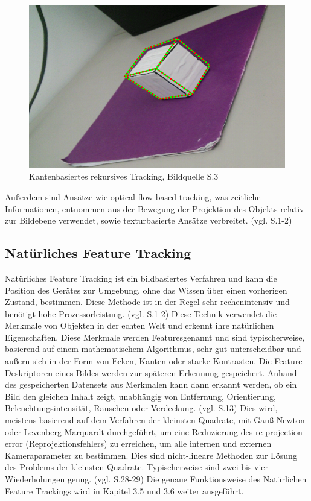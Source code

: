 \begin{figure}[H]
	\centering
	\includegraphics[scale=0.7]{wire.png}
	\caption{Kantenbasiertes rekursives Tracking, Bildquelle \cite{model_based} S.3}
\end{figure} 

Außerdem sind Ansätze wie \glqq optical flow based tracking\grqq{}, was zeitliche Informationen, entnommen aus der Bewegung der Projektion des Objekts relativ zur Bildebene verwendet, sowie texturbasierte Ansätze verbreitet. (vgl. \cite{model_based} S.1-2)

\subsection{Natürliches Feature Tracking}

Natürliches Feature Tracking ist ein bildbasiertes Verfahren und kann die Position des Gerätes zur Umgebung, ohne das Wissen über einen vorherigen Zustand, bestimmen. Diese Methode ist in der Regel sehr rechenintensiv und benötigt hohe Prozessorleistung. (vgl. \cite{model_based} S.1-2) Diese Technik verwendet die Merkmale von Objekten in der echten Welt und erkennt ihre natürlichen Eigenschaften. Diese Merkmale werden \glqq Features\grqq genannt und sind typischerweise, basierend auf einem mathematischem Algorithmus, sehr gut unterscheidbar und außern sich in der Form von Ecken, Kanten oder starke Kontrasten. Die Feature Deskriptoren eines Bildes werden zur späteren Erkennung gespeichert. Anhand des gespeicherten Datensets aus Merkmalen kann dann erkannt werden, ob ein Bild den gleichen Inhalt zeigt, unabhängig von Entfernung, Orientierung, Beleuchtungsintensität, Rauschen oder Verdeckung. (vgl. \cite{comparative_sdks} S.13) Dies wird, meistens basierend auf dem Verfahren der kleinsten Quadrate, mit Gauß-Newton oder Levenberg-Marquardt durchgeführt, um eine Reduzierung des \glqq re-projection error\grqq{} (Reprojektionsfehlers) zu erreichen, um alle internen und externen Kameraparameter zu bestimmen. Dies sind nicht-lineare Methoden zur Lösung des Problems der kleinsten Quadrate. Typischerweise sind zwei bis vier Wiederholungen genug. (vgl. \cite{natural_feature} S.28-29) Die genaue Funktionsweise des Natürlichen Feature Trackings wird in Kapitel 3.5 und 3.6 weiter ausgeführt.
 

